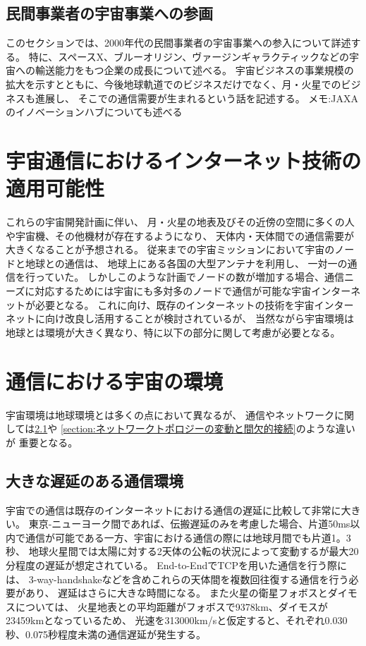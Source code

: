 \subsection{民間事業者の宇宙事業への参画}
\label{section:民間事業者の宇宙事業への参画}
このセクションでは、2000年代の民間事業者の宇宙事業への参入について詳述する。
特に、スペースX、ブルーオリジン、ヴァージンギャラクティックなどの宇宙への輸送能力をもつ企業の成長について述べる。
宇宙ビジネスの事業規模の拡大を示すとともに、今後地球軌道でのビジネスだけでなく、月・火星でのビジネスも進展し、
そこでの通信需要が生まれるという話を記述する。
メモ:JAXAのイノベーションハブについても述べる

\section{宇宙通信におけるインターネット技術の適用可能性}
\label{section:宇宙通信におけるインターネット技術の適用性}
これらの宇宙開発計画に伴い、 月・火星の地表及びその近傍の空間に多くの人や宇宙機、その他機材が存在するようになり、
天体内・天体間での通信需要が大きくなることが予想される。 
従来までの宇宙ミッションにおいて宇宙のノードと地球との通信は、 地球上にある各国の大型アンテナを利用し、 一対一の通信を行っていた。
しかしこのような計画でノードの数が増加する場合、通信ニーズに対応するためには宇宙にも多対多のノードで通信が可能な宇宙インターネットが必要となる。 
これに向け、既存のインターネットの技術を宇宙インターネットに向け改良し活用することが検討されているが、
当然ながら宇宙環境は地球とは環境が大きく異なり、特に以下の部分に関して考慮が必要となる。

\section{通信における宇宙の環境}
\label{section:通信における宇宙の環境}
宇宙環境は地球環境とは多くの点において異なるが、
通信やネットワークに関しては\ref{section:大きな遅延のある通信環境}や
\ref{section:ネットワークトポロジーの変動と間欠的接続}のような違いが
重要となる。


\subsection{大きな遅延のある通信環境}
\label{section:大きな遅延のある通信環境}
宇宙での通信は既存のインターネットにおける通信の遅延に比較して非常に大きい。
東京-ニューヨーク間であれば、伝搬遅延のみを考慮した場合、片道50ms以内で通信が可能である一方、宇宙における通信の際には地球月間でも片道1。3秒、
地球火星間では太陽に対する2天体の公転の状況によって変動するが最大20分程度の遅延が想定されている。
End-to-EndでTCPを用いた通信を行う際には、 3-way-handshakeなどを含めこれらの天体間を複数回往復する通信を行う必要があり、 
遅延はさらに大きな時間になる。 
\cite{McBrayer2022}
また火星の衛星フォボスとダイモスについては、
火星地表との平均距離がフォボスで9378km、ダイモスが23459kmとなっているため、
光速を313000km/sと仮定すると、それぞれ0.030秒、0.075秒程度未満の通信遅延が発生する。


